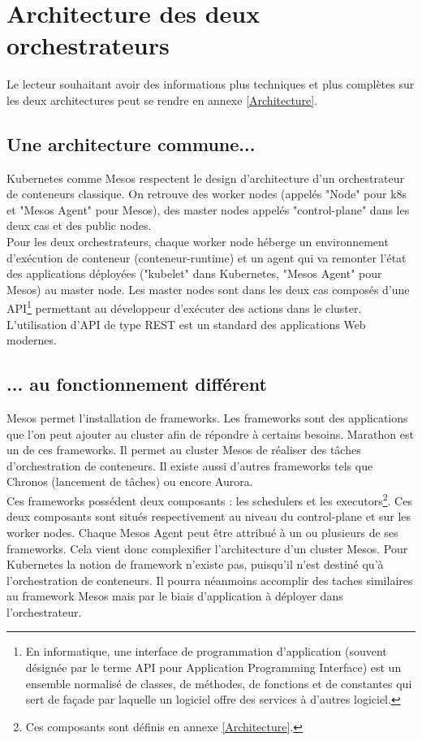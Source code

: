 \documentclass[11pt,fleqn]{book} %
\begin{document}
\section{Architecture des deux orchestrateurs}
Le lecteur souhaitant avoir des informations plus techniques et plus complètes sur les deux architectures peut se rendre en annexe \ref{Architecture}.
\subsection{Une architecture commune...}
Kubernetes comme Mesos respectent le design d'architecture d'un orchestrateur de conteneurs classique. On retrouve des worker nodes (appelés "Node" pour k8s et "Mesos Agent" pour Mesos), des master nodes appelés "control-plane" dans les deux cas et des public nodes.\\

Pour les deux orchestrateurs, chaque worker node héberge un environnement d'exécution de conteneur (conteneur-runtime) et un agent qui va remonter l'état des applications déployées ("kubelet" dans Kubernetes, "Mesos Agent" pour Mesos) au master node. Les master nodes sont dans les deux cas composés d'une API\footnote{En informatique, une interface de programmation d’application (souvent désignée par le terme API pour Application Programming Interface) est un ensemble normalisé de classes, de méthodes, de fonctions et de constantes qui sert de façade par laquelle un logiciel offre des services à d'autres logiciel.} permettant au développeur d'exécuter des actions dans le cluster. L'utilisation d'API de type REST est un standard des applications Web modernes.

\subsection{... au fonctionnement différent}
Mesos permet l'installation de frameworks. Les frameworks sont des applications que l'on peut ajouter au cluster afin de répondre à certains besoins. Marathon est un de ces frameworks. Il permet au cluster Mesos de réaliser des tâches d'orchestration de conteneurs. Il existe aussi d'autres frameworks tels que Chronos (lancement de tâches) ou encore Aurora.\\

Ces frameworks possédent deux composants : les schedulers et les executors\footnote{Ces composants sont définis en annexe \ref{Architecture}.}. Ces deux composants sont situés respectivement au niveau du control-plane et sur les worker nodes. Chaque Mesos Agent peut être attribué à un ou plusieurs de ses frameworks. Cela vient donc complexifier l'architecture d'un cluster Mesos. Pour Kubernetes la notion de framework n'existe pas, puisqu'il n'est destiné qu'à l'orchestration de conteneurs. Il pourra néanmoins accomplir des taches similaires au framework Mesos mais par le biais d'application à déployer dans l'orchestrateur. \\
\end{document}
